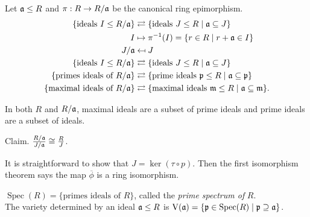 \begin{fact}
    Let $\mathfrak{a} \leq R$ and $\pi: R \to R/\mathfrak{a}$ be the canonical ring epimorphism. 
    \begin{align*}
        \{\text{ideals }I \leq R/\mathfrak{a}\} &\rightleftarrows \{\text{ideals }J \leq R \mid \mathfrak{a} \subseteq J\} \\
        I &\mapsto \pi^{-1}(I) = \{r \in R \mid r + \mathfrak{a} \in I\} \\
        J/\mathfrak{a} &\mapsfrom J \\
    \{\text{ideals } I \leq R/\mathfrak{a}\} &\rightleftarrows \{\text{ideals }J \leq R \mid \mathfrak{a} \subseteq J\} \\
        \{\text{primes ideals of } R/\mathfrak{a}\} &\rightleftarrows \{\text{prime ideals }\mathfrak{p} \leq R \mid \mathfrak{a} \subseteq \mathfrak{p}\} \\
        \{\text{maximal ideals of } R/\mathfrak{a}\} &\rightleftarrows \{\text{maximal ideals }\mathfrak{m} \leq R \mid \mathfrak{a} \subseteq \mathfrak{m}\}.
    \end{align*}
    \par
    In both $R$ and $R/\mathfrak{a}$, maximal ideals are a subset of prime ideals and prime ideals are a subset of ideals. \par
    Claim. $\frac{R/\mathfrak{a}}{J/\mathfrak{a}} \cong \frac{R}{J}$.
    \begin{center}
    \end{center}
    \par 
    It is straightforward to show that $J = \ker(\tau \circ p)$. Then the first isomorphism theorem says the map $\overbar \phi$ is a ring isomorphism. 
\end{fact}

\begin{notation*}
    $\operatorname{Spec}(R) = \{\text{primes ideals of $R$}\}$, called the \emph{prime spectrum of} $R$. \\
    The variety determined by an ideal $\mathfrak{a} \leq R$ is $\operatorname{V}(\mathfrak{a}) = \{\mathfrak{p} \in \operatorname{Spec}(R) \mid \mathfrak{p} \supseteq \mathfrak{a}\}$.
\end{notation*}

